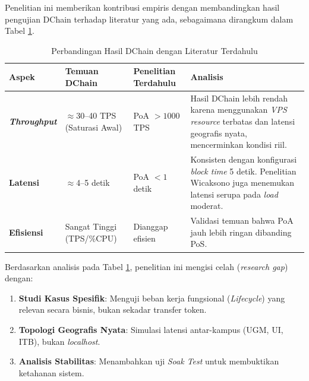 Penelitian ini memberikan kontribusi empiris dengan membandingkan hasil pengujian DChain terhadap literatur yang ada, sebagaimana dirangkum dalam Tabel \ref{tab:comparison_literature}.

\begin{table}[htbp]
\centering
\caption{Perbandingan Hasil DChain dengan Literatur Terdahulu}
\label{tab:comparison_literature}
\begin{tabularx}{\textwidth}{|>{\RaggedRight\arraybackslash}p{2.5cm}|>{\RaggedRight\arraybackslash}X|>{\RaggedRight\arraybackslash}X|>{\RaggedRight\arraybackslash}p{4cm}|}
\hline
\textbf{Aspek} & \textbf{Temuan DChain} & \textbf{Penelitian Terdahulu} & \textbf{Analisis} \\
\hline
\textbf{\textit{Throughput}} & $\approx$30--40 TPS (Saturasi Awal) & PoA $>1000$ TPS \cite{choi2020,rebello2020} & Hasil DChain lebih rendah karena menggunakan \textit{VPS resource} terbatas dan latensi geografis nyata, mencerminkan kondisi riil. \\
\hline
\textbf{Latensi} & $\approx$4--5 detik & PoA $<1$ detik \cite{arslan2020,wicaksono2025} & Konsisten dengan konfigurasi \textit{block time} 5 detik. Penelitian Wicaksono \cite{wicaksono2025} juga menemukan latensi serupa pada \textit{load} moderat. \\
\hline
\textbf{Efisiensi} & Sangat Tinggi (TPS/\%CPU) & Dianggap efisien \cite{sharma2020,ali2020} & Validasi temuan bahwa PoA jauh lebih ringan dibanding PoS. \\
\hline
\end{tabularx}
\end{table}

Berdasarkan analisis pada Tabel \ref{tab:comparison_literature}, penelitian ini mengisi celah (\textit{research gap}) dengan:
\begin{enumerate}
    \item \textbf{Studi Kasus Spesifik}: Menguji beban kerja fungsional (\textit{Lifecycle}) yang relevan secara bisnis, bukan sekadar transfer token.
    \item \textbf{Topologi Geografis Nyata}: Simulasi latensi antar-kampus (UGM, UI, ITB), bukan \textit{localhost}.
    \item \textbf{Analisis Stabilitas}: Menambahkan uji \textit{Soak Test} untuk membuktikan ketahanan sistem.
\end{enumerate}